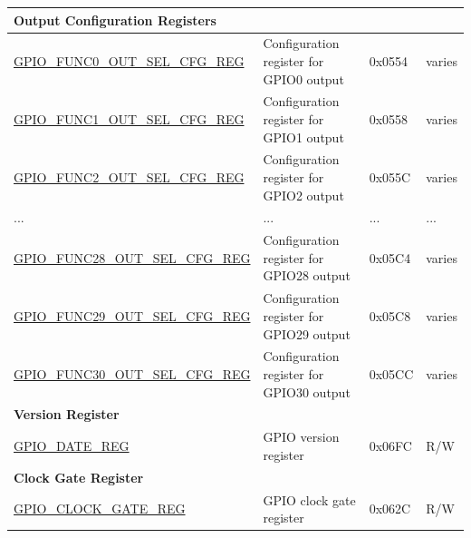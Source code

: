 \begin{longtable}{ | p{5.8cm} | p{7.2cm} | p{1.3cm} | p{2cm} | }
\multicolumn{4}{|l|}{\textbf{Output Configuration Registers}} \\ \hline
\hyperref[regdesc:GPIOFUNCNOUTSELCFGREG]{GPIO\_FUNC0\_OUT\_SEL\_CFG\_REG} & Configuration register for GPIO0 output & 0x0554 & varies \\ \hline
\hyperref[regdesc:GPIOFUNCNOUTSELCFGREG]{GPIO\_FUNC1\_OUT\_SEL\_CFG\_REG} & Configuration register for GPIO1 output & 0x0558 & varies \\ \hline
\hyperref[regdesc:GPIOFUNCNOUTSELCFGREG]{GPIO\_FUNC2\_OUT\_SEL\_CFG\_REG} & Configuration register for GPIO2 output & 0x055C & varies \\ \hline
...& ... & ... & ... \\ \hline
\hyperref[regdesc:GPIOFUNCNOUTSELCFGREG]{GPIO\_FUNC28\_OUT\_SEL\_CFG\_REG} & Configuration register for GPIO28 output & 0x05C4 & varies \\ \hline
\hyperref[regdesc:GPIOFUNCNOUTSELCFGREG]{GPIO\_FUNC29\_OUT\_SEL\_CFG\_REG} & Configuration register for GPIO29 output & 0x05C8 & varies \\ \hline
\hyperref[regdesc:GPIOFUNCNOUTSELCFGREG]{GPIO\_FUNC30\_OUT\_SEL\_CFG\_REG} & Configuration register for GPIO30 output & 0x05CC & varies \\ \hline

\multicolumn{4}{|l|}{\textbf{Version Register}} \\ \hline
\hyperref[regdesc:GPIOREGDATEREG]{GPIO\_DATE\_REG} & GPIO version register & 0x06FC & R/W \\ \hline

\multicolumn{4}{|l|}{\textbf{Clock Gate Register}} \\ \hline
\hyperref[regdesc:GPIOCLOCKGATEREG]{GPIO\_CLOCK\_GATE\_REG} & GPIO clock gate register & 0x062C & R/W \\ \hline
\end{longtable}
